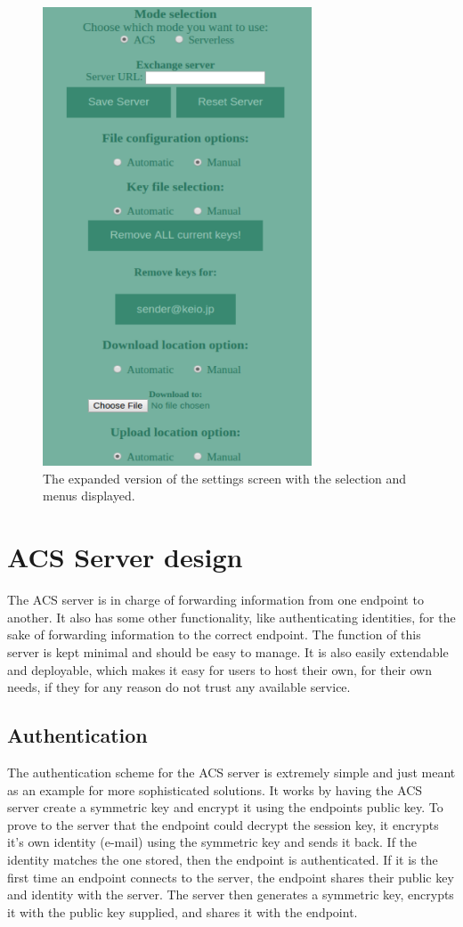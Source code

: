 		\begin{figure}[H]
		  \centering
		  \includegraphics[width=80mm]{Figures/Base/settings_expanded}
		  \decoRule
		  \caption[Detailed settings screen]{The expanded version of the settings screen with the selection and menus displayed.}
		  \label{fig:set_det}
		\end{figure}

%
\section{ACS Server design}
\label{sec:acs_serv}
The ACS server is in charge of forwarding information from one endpoint to another. It also has some other functionality, like authenticating identities, for the sake of forwarding information to the correct endpoint. The function of this server is kept minimal and should be easy to manage. It is also easily extendable and deployable, which makes it easy for users to host their own, for their own needs, if they for any reason do not trust any available service.
%
	\subsection{Authentication}
	\label{sec:wsprot_auth}
		The authentication scheme for the ACS server is extremely simple and just meant as an example for more sophisticated solutions. It works by having the ACS server create a symmetric key and encrypt it using the endpoints public key. To prove to the server that the endpoint could decrypt the session key, it encrypts it's own identity (e-mail) using the symmetric key and sends it back. If the identity matches the one stored, then the endpoint is authenticated. If it is the first time an endpoint connects to the server, the endpoint shares their public key and identity with the server. The server then generates a symmetric key, encrypts it with the public key supplied, and shares it with the endpoint.	%
		
